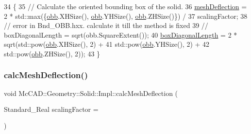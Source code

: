 \begin{DoxyCode}
34                                                                      \{
35     \textcolor{comment}{// Calculate the oriented bounding box of the solid.}
36     \hyperlink{classMcCAD_1_1Geometry_1_1Solid_1_1Impl_af8a04ab67e6fa83736a4ae9ebcfcc877}{meshDeflection} = 2 * std::max(\{\hyperlink{classMcCAD_1_1Geometry_1_1Solid_1_1Impl_abb00ec0b4230c6e484b751812bcc9050}{obb}.XHSize(), \hyperlink{classMcCAD_1_1Geometry_1_1Solid_1_1Impl_abb00ec0b4230c6e484b751812bcc9050}{obb}.YHSize(), 
      \hyperlink{classMcCAD_1_1Geometry_1_1Solid_1_1Impl_abb00ec0b4230c6e484b751812bcc9050}{obb}.ZHSize()\}) /
37             scalingFactor;
38     \textcolor{comment}{// error in Bnd\_OBB.hxx. calculate it till the method is fixed}
39     \textcolor{comment}{// boxDiagonalLength = sqrt(obb.SquareExtent());}
40     \hyperlink{classMcCAD_1_1Geometry_1_1Solid_1_1Impl_a797ace8ee10123eab4bd27ef4385cbd3}{boxDiagonalLength} = 2 * sqrt(std::pow(\hyperlink{classMcCAD_1_1Geometry_1_1Solid_1_1Impl_abb00ec0b4230c6e484b751812bcc9050}{obb}.XHSize(), 2) +
41                                  std::pow(\hyperlink{classMcCAD_1_1Geometry_1_1Solid_1_1Impl_abb00ec0b4230c6e484b751812bcc9050}{obb}.YHSize(), 2) +
42                                  std::pow(\hyperlink{classMcCAD_1_1Geometry_1_1Solid_1_1Impl_abb00ec0b4230c6e484b751812bcc9050}{obb}.ZHSize(), 2));
43 \}
\end{DoxyCode}
\mbox{\label{classMcCAD_1_1Geometry_1_1Solid_1_1Impl_a0ef5f0f364356801915a7bc7a38a02ff}} 
\subsubsection{\texorpdfstring{calc\+Mesh\+Deflection()}{calcMeshDeflection()}\hspace{0.1cm}{\footnotesize\ttfamily [2/2]}}
{\footnotesize\ttfamily void Mc\+C\+A\+D\+::\+Geometry\+::\+Solid\+::\+Impl\+::calc\+Mesh\+Deflection (\begin{DoxyParamCaption}\item[{Standard\+\_\+\+Real}]{scaling\+Factor = {} }\end{DoxyParamCaption})}

